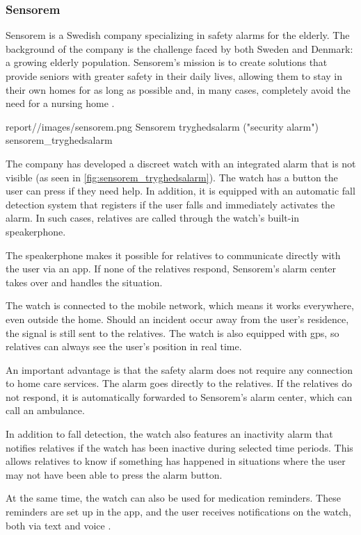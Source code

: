 \subsubsection{Sensorem}




Sensorem is a Swedish company specializing in safety alarms for the elderly. The background of the company is the challenge faced by both Sweden and Denmark: a growing elderly population. Sensorem’s mission is to create solutions that provide seniors with greater safety in their daily lives, allowing them to stay in their own homes for as long as possible and, in many cases, completely avoid the need for a nursing home \cite{noauthor_om_nodate}.

    {report//images/sensorem.png}
    {Sensorem tryghedsalarm ("security alarm")}
    {sensorem_tryghedsalarm}



The company has developed a discreet watch with an integrated alarm that is not visible (as seen in \autoref{fig:sensorem_tryghedsalarm}). The watch has a button the user can press if they need help. In addition, it is equipped with an automatic fall detection system that registers if the user falls and immediately activates the alarm. In such cases, relatives are called through the watch’s built-in speakerphone.

The speakerphone makes it possible for relatives to communicate directly with the user via an app. If none of the relatives respond, Sensorem's alarm center takes over and handles the situation.

The watch is connected to the mobile network, which means it works everywhere, even outside the home. Should an incident occur away from the user’s residence, the signal is still sent to the relatives. The watch is also equipped with \gls{gps}, so relatives can always see the user’s position in real time.

An important advantage is that the safety alarm does not require any connection to home care services. The alarm goes directly to the relatives. If the relatives do not respond, it is automatically forwarded to Sensorem's alarm center, which can call an ambulance.

In addition to fall detection, the watch also features an inactivity alarm that notifies relatives if the watch has been inactive during selected time periods. This allows relatives to know if something has happened in situations where the user may not have been able to press the alarm button.

At the same time, the watch can also be used for medication reminders. These reminders are set up in the app, and the user receives notifications on the watch, both via text and voice \cite{noauthor_tryghedsalarm_nodate}.
